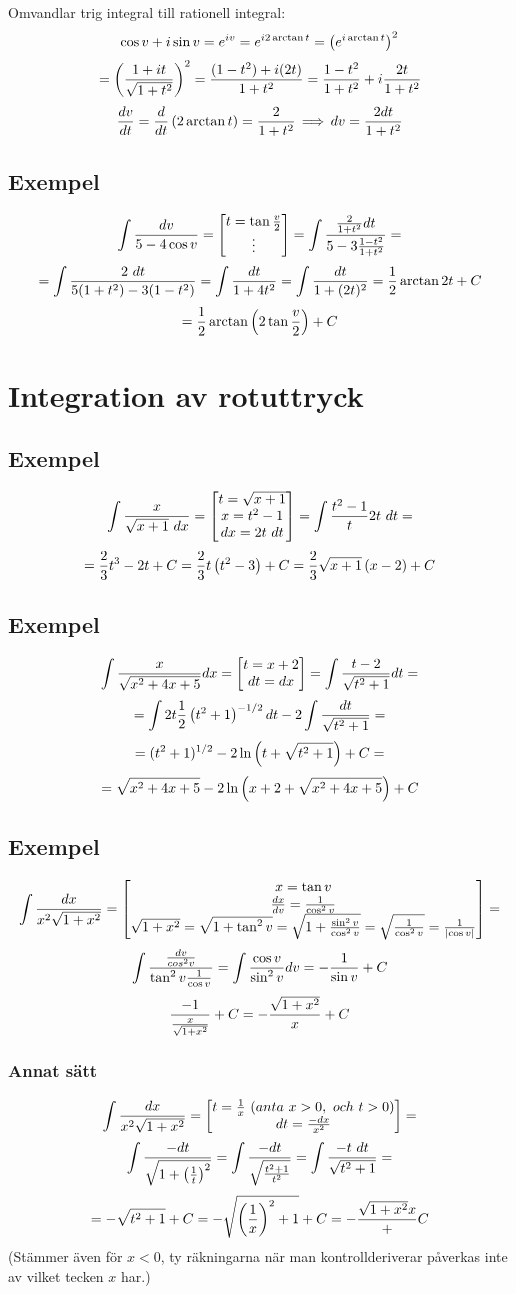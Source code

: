 \documentclass{article}
\begin{document}
Omvandlar trig integral till rationell integral:
$$ \cos v + i \sin v = e^{iv} = e^{i2\arctan t} = \left(e^{i \arctan t}\right)^2 $$
$$ =\left(\frac{1+it}{\sqrt{1+t^2}}\right)^2  = \frac{(1-t^2) + i(2t)}{1+t^2} = \frac{1-t^2}{1+t^2} + i\frac{2t}{1+t^2}$$
$$ \frac{dv}{dt} = \frac{d}{dt}\left(2\arctan t\right) = \frac{2}{1+t^2}\operatorname{\implies} dv=\frac{2dt}{1+t^2} $$

\subsection{Exempel}
$$\int{\frac{dv}{5-4\cos v}} =\left[\begin{matrix}t=\tan \frac{v}{2} \\\vdots\end{matrix}\right] = \int{\frac{\frac{2}{1+t^2}dt}{5-3\frac{1-t^2}{1+t^2}}}=$$
$$=\int{\frac{2\ dt}{5(1+t^2)-3(1-t^2)}} = \int{\frac{dt}{1+4t^2}} = \int{\frac{dt}{1+(2t)^2}} = \frac{1}{2} \arctan 2t +C  $$
$$ = \frac{1}{2} \arctan \left(2\tan \frac{v}{2}\right) + C $$

\section{Integration av rotuttryck}
\subsection{Exempel}
$$ \int{\f x{\sqrt{x+1}\ dx}} = \bmat{t=\sqrt{x+1} \\ x= t^2-1 \\ dx=2t\ dt} = \int{\f{t^2-1}t 2t\ dt}=$$
$$ = \frac{2}{3} t^3 - 2t + C = \frac{2}{3} t \left(t^2-3\right) +C = \frac{2}{3} \sqrt{x+1}\left(x-2\right)+C$$

\subsection{Exempel}
$$\int{\frac{x}{\sqrt{x^2+4x+5} } dx} =\left[\begin{matrix}t=x+2\\ dt=dx\end{matrix}\right] = \int{\frac{t-2}{\sqrt{t^2+1}} dt} =$$
$$=\int{ 2t\frac{1}{2} \left(t^2+1\right)^{-1/2} dt - 2\int{dt\over \sqrt{t^2+1}} }=$$
$$ = (t^2+1)^{1/2}  - 2\ln\left(t+\sqrt{t^2+1}\right) +C=$$
$$ = \sqrt{x^2+4x+5} - 2\ln\left(x+2+\sqrt{x^2+4x+5}\right) +C$$

\subsection{Exempel}
$$ \int{\frac{dx}{x^2\sqrt{1+x^2}}} = \left[\begin{matrix}x=\tan v \\ \frac{dx}{dv} = \frac{1}{\cos^2 v} \\ \sqrt{1+x^2} = \sqrt{1+\tan^2 v}  = \sqrt{1+\frac{\sin^2 v}{\cos^2 v}} = \sqrt{\frac{1}{\cos^2 v}} = \frac{1}{\lvert\cos v\rvert}\end{matrix}\right]=$$
$$ \int{ \frac{ \frac{dv}{cos^2 v} }{ \tan^2 v \frac{1}{\cos v} } } = \int{\frac{\cos v}{\sin^2 v} dv} = -\frac{1}{\sin v} +C$$
$$ \frac{-1}{\frac{x}{\sqrt{1+x^2}}} +C = -\frac{\sqrt{1+x^2}}{x} + C $$

\subsubsection{Annat sätt}
$$ \int{\frac{dx}{x^2\sqrt{1+x^2}}} =\left[\begin{matrix}t=\frac{1}{x}\ (anta\ x>0,\ och\ t>0) \\ dt=\frac{-dx}{x^2}\end{matrix}\right] =$$
$$ \int{\f{-dt}{\sqrt{1+\pa{\f 1t}^2}}} = \int{\f{-dt}{\sqrt{\f{t^2+1}{t^2}}}} = \int{ \f{-t\ dt}{\sqrt{t^2+1}} } =$$
$$ = -\sqrt{t^2+1} + C= -\sqrt{\left(\frac{1}{x}\right)^2 + 1} + C = -\frac{\sqrt{1+x^2}x}{+} C$$
(Stämmer även för $x<0$, ty räkningarna när man kontrollderiverar påverkas inte av vilket tecken $x$ har.)
\end{document}
